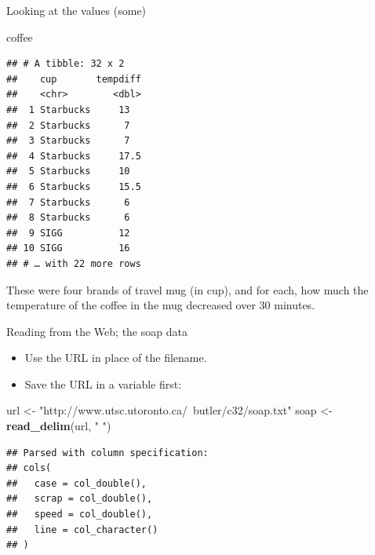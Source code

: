 \documentclass[
  ignorenonframetext,
]{beamer}
\newenvironment{Shaded}{\begin{snugshade}}{\end{snugshade}}
\newcommand{\KeywordTok}[1]{\textcolor[rgb]{0.13,0.29,0.53}{\textbf{#1}}}
\newcommand{\NormalTok}[1]{#1}
\newcommand{\StringTok}[1]{\textcolor[rgb]{0.31,0.60,0.02}{#1}}
\providecommand{\tightlist}{%
  \setlength{\itemsep}{0pt}\setlength{\parskip}{0pt}}
\begin{document}
\begin{frame}[fragile]{Looking at the values (some)}
\protect\hypertarget{looking-at-the-values-some}{}

\begin{Shaded}
\begin{Highlighting}[]
\NormalTok{coffee}
\end{Highlighting}
\end{Shaded}

\begin{verbatim}
## # A tibble: 32 x 2
##    cup       tempdiff
##    <chr>        <dbl>
##  1 Starbucks     13  
##  2 Starbucks      7  
##  3 Starbucks      7  
##  4 Starbucks     17.5
##  5 Starbucks     10  
##  6 Starbucks     15.5
##  7 Starbucks      6  
##  8 Starbucks      6  
##  9 SIGG          12  
## 10 SIGG          16  
## # … with 22 more rows
\end{verbatim}

These were four brands of travel mug (in cup), and for each, how much
the temperature of the coffee in the mug decreased over 30 minutes.

\end{frame}

\begin{frame}[fragile]{Reading from the Web; the soap data}
\protect\hypertarget{reading-from-the-web-the-soap-data}{}

\begin{itemize}
\tightlist
\item
  Use the URL in place of the filename.
\item
  Save the URL in a variable first:
\end{itemize}

\begin{Shaded}
\begin{Highlighting}[]
\NormalTok{url <-}\StringTok{ "http://www.utsc.utoronto.ca/~butler/c32/soap.txt"}
\NormalTok{soap <-}\StringTok{ }\KeywordTok{read_delim}\NormalTok{(url, }\StringTok{" "}\NormalTok{)}
\end{Highlighting}
\end{Shaded}

\begin{verbatim}
## Parsed with column specification:
## cols(
##   case = col_double(),
##   scrap = col_double(),
##   speed = col_double(),
##   line = col_character()
## )
\end{verbatim}

\end{frame}
\end{document}
